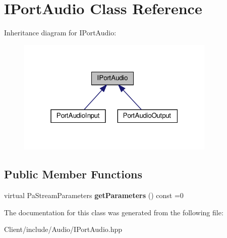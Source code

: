 \hypertarget{class_i_port_audio}{}\section{I\+Port\+Audio Class Reference}
\label{class_i_port_audio}


Inheritance diagram for I\+Port\+Audio\+:
\nopagebreak
\begin{figure}[H]
\begin{center}
\leavevmode
\includegraphics[width=268pt]{class_i_port_audio__inherit__graph}
\end{center}
\end{figure}
\subsection*{Public Member Functions}
\begin{DoxyCompactItemize}
\item 
\mbox{\label{class_i_port_audio_ac21459d7ae40b3491cf4509af7f86572}} 
virtual Pa\+Stream\+Parameters {\bfseries get\+Parameters} () const =0
\end{DoxyCompactItemize}


The documentation for this class was generated from the following file\+:\begin{DoxyCompactItemize}
\item 
Client/include/\+Audio/I\+Port\+Audio.\+hpp\end{DoxyCompactItemize}
